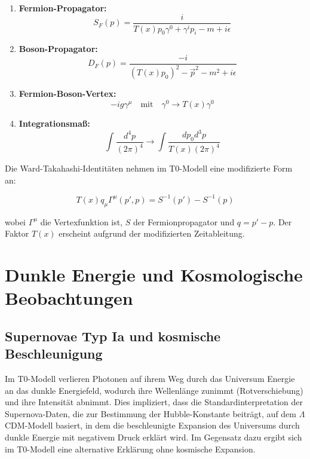 \documentclass[a4paper,12pt]{article}
\theoremstyle{definition}
\theoremstyle{remark}
\newcommand{\Tfield}{T(x)} %
\begin{document}
	\begin{enumerate}
		\item \textbf{Fermion-Propagator:}
		\begin{equation}
			S_F(p) = \frac{i}{\Tfield p_0 \gamma^0 + \gamma^i p_i - m + i\epsilon}
		\end{equation}
		
		\item \textbf{Boson-Propagator:}
		\begin{equation}
			D_F(p) = \frac{-i}{(\Tfield p_0)^2 - \vec{p}^2 - m^2 + i\epsilon}
		\end{equation}
		
		\item \textbf{Fermion-Boson-Vertex:}
		\begin{equation}
			-ig\gamma^\mu \quad \text{mit} \quad \gamma^0 \rightarrow \Tfield \gamma^0
		\end{equation}
		
		\item \textbf{Integrationsmaß:}
		\begin{equation}
			\int \frac{d^4p}{(2\pi)^4} \rightarrow \int \frac{dp_0 d^3p}{\Tfield (2\pi)^4}
		\end{equation}
	\end{enumerate}
	
	Die Ward-Takahashi-Identitäten nehmen im T0-Modell eine modifizierte Form an:
	
	\begin{equation}
		\Tfield q_\mu \Gamma^\mu(p',p) = S^{-1}(p') - S^{-1}(p)
	\end{equation}
	
	wobei $\Gamma^\mu$ die Vertexfunktion ist, $S$ der Fermionpropagator und $q = p' - p$. Der Faktor $\Tfield$ erscheint aufgrund der modifizierten Zeitableitung.
	
	\section{Dunkle Energie und Kosmologische Beobachtungen}
	
	\subsection{Supernovae Typ Ia und kosmische Beschleunigung}
	
	Im T0-Modell verlieren Photonen auf ihrem Weg durch das Universum Energie an das dunkle Energiefeld, wodurch ihre Wellenlänge zunimmt (Rotverschiebung) und ihre Intensität abnimmt. Dies impliziert, dass die Standardinterpretation der Supernova-Daten, die zur Bestimmung der Hubble-Konstante beiträgt, auf dem $\Lambda$CDM-Modell basiert, in dem die beschleunigte Expansion des Universums durch dunkle Energie mit negativem Druck erklärt wird. Im Gegensatz dazu ergibt sich im T0-Modell eine alternative Erklärung ohne kosmische Expansion.
	
\end{document}
